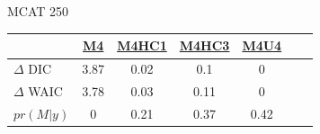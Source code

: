 \documentclass[ xcolor = pdftex, dvipsnames, table ]{beamer}
\begin{document}
\subsection{}
\begin{frame}{MCAT 250}
        \begin{table}[ht!]
        \centering
        \begin{tabular}[c]{@{}lcccccc@{}}
        \hline
        & \href{https://github.com/gasduster99/sppComp/tree/master/sscRuns/25019781982M4}{M4} & \href{https://github.com/gasduster99/sppComp/tree/master/sscRuns/25019781982M4HC1}{M4HC1} & \href{https://github.com/gasduster99/sppComp/tree/master/sscRuns/25019781982M4HC3}{M4HC3} & \href{https://github.com/gasduster99/sppComp/tree/master/sscRuns/25019781982M4U4}{M4U4} \\ \hline
        \(\Delta\) DIC & 3.87 & 0.02 & 0.1 & 0 \\                                         
	\(\Delta\) WAIC & 3.78 & 0.03 & 0.11 & 0 \\                                       
	\(pr(M|y)\) & 0 & 0.21 & 0.37 & 0.42 \\ \hline
	\end{tabular}
        \end{table}
\end{frame}

%
%
\end{document}
